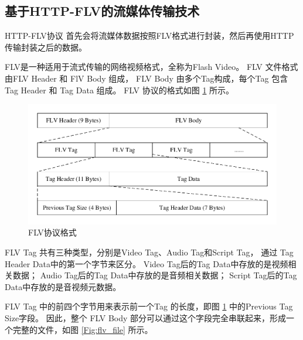 \newpage
\subsection{基于HTTP-FLV的流媒体传输技术}
HTTP-FLV协议
首先会将流媒体数据按照FLV格式进行封装，然后再使用HTTP传输封装之后的数据。

FLV是一种适用于流式传输的网络视频格式，全称为Flash Video。
FLV 文件格式由FLV Header 和 FlV Body 组成，
FLV Body 由多个Tag构成，每个Tag 包含 Tag Header 和 Tag Data 组成\cite{夏俊锋0HTML5}。
FLV 协议的格式如图 \ref{Fig:flv} 所示。

\begin{figure}[ht]
    \centering
    \includegraphics[width=0.8\linewidth]{./Figure/IMG_flv.pdf}
    \caption{FLV协议格式}
    \label{Fig:flv}
\end{figure}

FLV Tag 共有三种类型，分别是Video Tag、Audio Tag和Script Tag，
通过 Tag Header Data中的第一个字节来区分。
Video Tag后的Tag Data中存放的是视频相关数据；
Audio Tag后的Tag Data中存放的是音频相关数据；
Script Tag后的Tag Data中存放的是音视频元数据。

FLV Tag 中的前四个字节用来表示前一个Tag 的长度，即图 \ref{Fig:flv} 中的Previous Tag Size字段。
因此，整个 FLV Body 部分可以通过这个字段完全串联起来，形成一个完整的文件，如图 \ref{Fig:flv_file} 所示。

